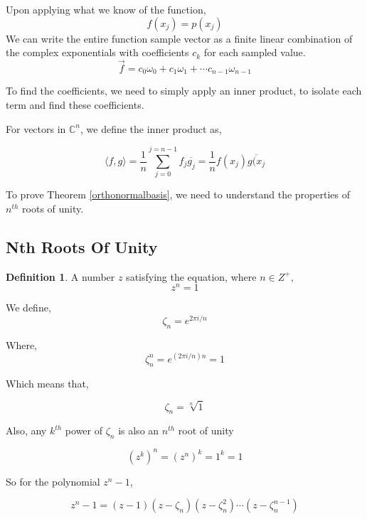 \documentclass[11pt]{amsart}
\theoremstyle{definition}
\newtheorem{defn}[thm]{Definition}
\theoremstyle{remark}
\numberwithin{equation}{section}
\begin{document}
Upon applying what we know of the function,
\[
	f(x_j) = p(x_j)
\]
We can write the entire function sample vector as a finite linear combination of the complex exponentials with coefficients $c_k$ for each sampled value.
\begin{equation}
	\vec{f} = c_0 \omega_0 + c_1 \omega_1 + \cdots c_{n-1} \omega_{n-1}
	\label{complexeform}
\end{equation}

To find the coefficients, we need to simply apply an inner product, to isolate each term and find these coefficients.

For vectors in $\mathbb{C}^n$, we define the inner product as,

\[
	\langle f,g \rangle = \frac{1}{n} \sum_{j = 0}^{j = n-1} f_j \overline{g_j} = \frac{1}{n} f(x_j) \overline{g(x_j}
\]

To prove Theorem \ref{orthonormalbasis}, we need to understand the properties of $n^{th}$ roots of unity.

\subsection{Nth Roots Of Unity}
\begin{defn}
A number $z$ satisfying the equation, where $n \in Z^+$,
\[
	z^n = 1
\]
\end{defn}
We define, 
\[
	\zeta_n = e^{2 \pi i/n}
\]

Where,
\[
	\zeta_n^n = e^{(2 \pi i / n)n} = 1
\]

Which means that,

\[
	\zeta_n = \sqrt[n]{1}
\]

Also, any $k^{th}$ power of $\zeta_n$ is also an $n^{th}$ root of unity

\[
	(z^k)^n = (z^n)^k = 1^k = 1
\]

So for the polynomial $z^n - 1$,

\[
		z^{n}-1 = (z-1)(z -  \zeta_n)(z-\zeta_n^2)\cdots(z - \zeta_n^{n-1}) 
\]
\end{document}
